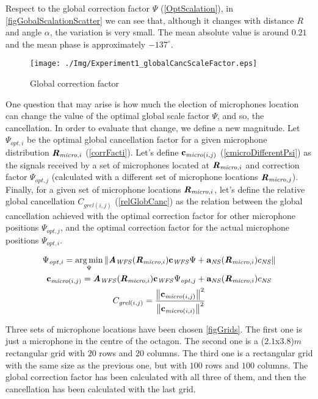 Respect to the global correction factor $\Psi$ (\autoref{OptScalation}), in \autoref{figGobalScalationScatter} we can see that, although it changes with distance $R$ and angle $\alpha$, the variation is very small. The mean absolute value is around $0.21$ and the mean phase is approximately $-137^\circ$. 

\begin{figure}
	\centering
	\texttt{[image: ./Img/Experiment1\_globalCancScaleFactor.eps]}
	\caption[Global correction factor]{Global correction factor}
	\label{figGobalScalationScatter}
\end{figure}

One question that may arise is how much the election of microphones location can change the value of the optimal global scale factor $\Psi$, and so, the cancellation. In order to evaluate that change, we define a new magnitude. Let $\Psi_{\mathit{opt}, i}$ be the optimal global cancellation factor for a given microphone distribution $\pos[matMicro]{,i}$ (\autoref{corrFacti}). Let's define $\cmicro[(i,j)]$ (\autoref{cmicroDifferentPsi}) as the signals received by a set of microphones located at $\pos[matMicro]{,i}$ and correction factor $\Psi_{\mathit{opt}, j}$ (calculated with a different set of microphone locations $\pos[matMicro]{,j}$). Finally, for a given set of microphone locations $\pos[matMicro]{,i}$, let's define the relative global cancellation $C_{\mathit{grel}(i,j)}$ (\autoref{relGlobCanc}) as the relation between the global cancellation achieved with the optimal correction factor for other microphone positions $\Psi_{\mathit{opt}, j}$, and the optimal correction factor for the actual microphone positions $\Psi_{\mathit{opt}, i}$.

\begin{gather}
\Psi_{\mathit{opt}, i} = \argmin_{\Psi} \norm{\Awfs(\pos[matMicro]{,i})\cwfs \Psi + \vec{a}_{\mathit{NS}}(\pos[matMicro]{,i}) \cnsScalar} \label{corrFacti} \\
\cmicro[(i,j)] = \Awfs(\pos[matMicro]{,i})\cwfs \Psi_{\mathit{opt}, j} + \vec{a}_{\mathit{NS}}(\pos[matMicro]{,i}) \cnsScalar \label{cmicroDifferentPsi} \\
C_{\mathit{grel}(i,j)} = \frac{\norm{\cmicro[(i,j)]}^2}{\norm{\cmicro[(i,i)]}^2} \label{relGlobCanc}
\end{gather}

Three sets of microphone locations have been chosen \autoref{figGrids}. The first one is just a microphone in the centre of the octagon. The second one is a ($2.1$x$3.8$)$\si{m}$ rectangular grid with $20$ rows and $20$ columns. The third one is a rectangular grid with the same size as the previous one, but with $100$ rows and $100$ columns. The global correction factor has been calculated with all three of them, and then the cancellation has been calculated with the last grid.  

